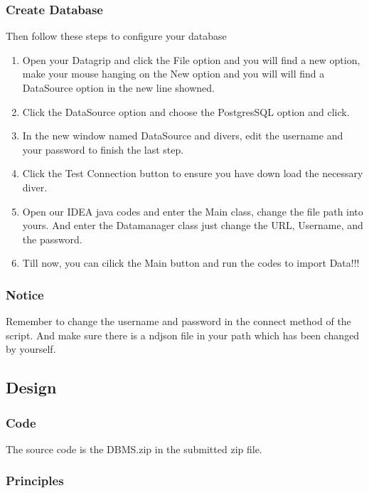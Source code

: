 \documentclass{article}
\begin{document}
\subsubsection{Create Database}
Then follow these steps to configure your database
\begin{enumerate}
\item Open your Datagrip and click the File option and you will find a new option, make your mouse hanging on the New option and you will will find a DataSource option in the new line showned.
\item Click the DataSource option and choose the PostgresSQL option and click.
\item In the new window named DataSource and divers, edit the username and your password to finish the last step.
\item Click the Test Connection button to ensure you have down load the necessary diver.
\item Open our IDEA java codes and enter the Main class, change the file path into yours. And enter the Datamanager class just change the URL, Username, and the password.
\item Till now, you can cilick the Main button and run the codes to import Data!!!
\end{enumerate}
\subsubsection{Notice}
 Remember to change the username and password in the connect method of
 the script. And make sure there is a ndjson file in your path which has been changed by yourself.
\subsection{Design}
\subsubsection{Code}
 The source code is the DBMS.zip in the submitted zip file.
\subsubsection{Principles}
\end{document}
